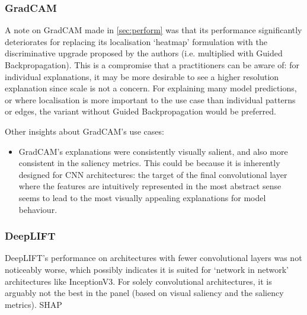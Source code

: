 \documentclass[main]{subfiles}
\begin{document}
\subsubsection{GradCAM}
A note on GradCAM made in \ref{sec:perform} was that its performance significantly deteriorates for replacing its localisation `heatmap' formulation with the discriminative upgrade proposed by the authors (i.e. multiplied with Guided Backpropagation). This is a compromise that a practitioners can be aware of: for individual explanations, it may be more desirable to see a higher resolution explanation since scale is not a concern. For explaining many model predictions, or where localisation is more important to the use case than individual patterns or edges, the variant without Guided Backpropagation would be preferred.

Other insights about GradCAM's use cases:
\begin{itemize}
\item GradCAM's explanations were consistently visually salient, and also more consistent in the saliency metrics. This could be because it is inherently designed for CNN architectures: the target of the final convolutional layer where the features are intuitively represented in the most abstract sense seems to lead to the most visually appealing explanations for model behaviour.
\end{itemize}

\newpage
\subsubsection{DeepLIFT}

DeepLIFT's performance on architectures with fewer convolutional layers was not noticeably worse, which possibly indicates it is suited for `network in network' architectures like InceptionV3. For solely convolutional architectures, it is arguably not the best in the panel (based on visual saliency and the saliency metrics). SHAP 
\end{document}
